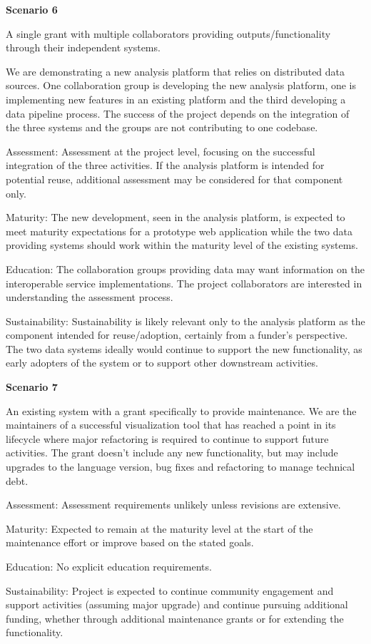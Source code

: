 \documentclass{article}
\begin{document}
\textbf{Scenario 6} 
\begin{adjustwidth}{1cm}{0cm}
A single grant with multiple collaborators providing outputs/functionality through their independent systems.

We are demonstrating a new analysis platform that relies on distributed data sources. One collaboration group is developing the new analysis platform, one is implementing new features in an existing platform and the third developing a data pipeline process. The success of the project depends on the integration of the three systems and the groups are not contributing to one codebase.
 
Assessment: Assessment at the project level, focusing on the successful integration of the three activities. If the analysis platform is intended for potential reuse, additional assessment may be considered for that component only.
 
Maturity: The new development, seen in the analysis platform, is expected to meet maturity expectations for a prototype web application while the two data providing systems should work within the maturity level of the existing systems.
 
Education: The collaboration groups providing data may want information on the interoperable service implementations. The project collaborators are interested in understanding the assessment process.
 
Sustainability: Sustainability is likely relevant only to the analysis platform as the component intended for reuse/adoption, certainly from a funder’s perspective. The two data systems ideally would continue to support the new functionality, as early adopters of the system or to support other downstream activities.
\end{adjustwidth}

\textbf{Scenario 7} 
\begin{adjustwidth}{1cm}{0cm}
An existing system with a grant specifically to provide maintenance.
We are the maintainers of a successful visualization tool that has reached a point in its lifecycle where major refactoring is required to continue to support future activities. The grant doesn’t include any new functionality, but may include upgrades to the language version, bug fixes and refactoring to manage technical debt.
 
Assessment: Assessment requirements unlikely unless revisions are extensive.
 
Maturity: Expected to remain at the maturity level at the start of the maintenance effort or improve based on the stated goals.
 
Education: No explicit education requirements.
 
Sustainability: Project is expected to continue community engagement and support activities (assuming major upgrade) and continue pursuing additional funding, whether through additional maintenance grants or for extending the functionality.
\end{adjustwidth}
\end{document}

